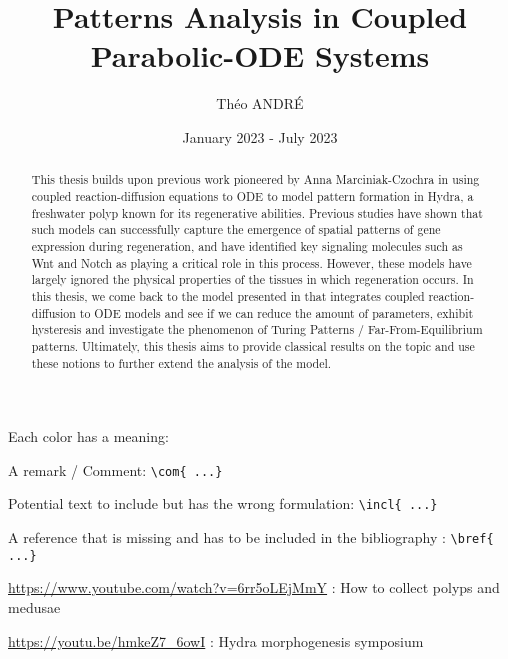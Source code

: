 \documentclass[12pt]{article}
\title{\textbf{Patterns Analysis in Coupled Parabolic-ODE Systems}}
\author{Théo ANDRÉ}
\affil{Turing Center For Living Systems \& Aix-Marseille Université}
\date{January 2023 - July 2023}
\begin{document}
\maketitle


\begin{abstract}
    This thesis builds upon previous work pioneered by Anna Marciniak-Czochra in using coupled reaction-diffusion equations to ODE to model pattern formation in Hydra, a freshwater polyp known for its regenerative abilities. Previous studies have shown that such models can successfully capture the emergence of spatial patterns of gene expression during regeneration, and have identified key signaling molecules such as Wnt and Notch as playing a critical role in this process. However, these models have largely ignored the physical properties of the tissues in which regeneration occurs. In this thesis, we come back to the model presented in \cite{AnnaThesis} that integrates coupled reaction-diffusion to ODE models and see if we can reduce the amount of parameters, exhibit hysteresis and investigate the phenomenon of Turing Patterns / Far-From-Equilibrium patterns. Ultimately, this thesis aims to provide classical results on the topic and use these notions to further extend the analysis of the model.
\end{abstract}

\vspace{30pt}

\begin{remark} Each color has a meaning: 
	\bigskip
	
	 A remark / Comment: \texttt{\textbackslash com\{ ...\}}
	\bigskip
	
	 Potential text to include but has the wrong formulation: \texttt{\textbackslash incl\{ ...\}}
	\bigskip
	
	 A reference that is missing and has to be included in the bibliography : \texttt{\textbackslash bref\{ ...\}}
\end{remark}

\newpage

\tableofcontents
\bigskip\bigskip

\url{https://www.youtube.com/watch?v=6rr5oLEjMmY} : How to collect polyps and medusae

\url{https://youtu.be/hmkeZ7_6owI} : Hydra morphogenesis symposium



\newpage
\end{document}

